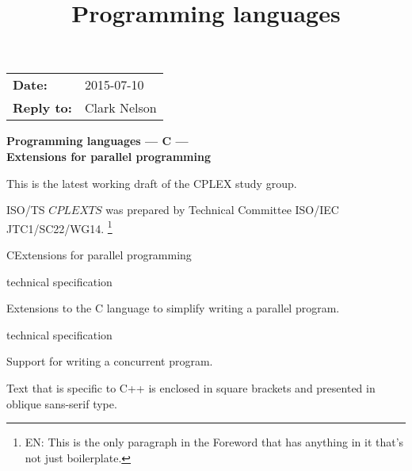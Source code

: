 \documentclass[
	techspec,	%
	final,		%
	notcopyright,	%
	letterpaper	%
	]{isov2}
\newcommand{\cplexts}{$CPLEXTS$}
\begin{document}
\begin{cover}
\begin{tabular}{l l}
\textbf{Date:} & 2015-07-10 \\
\textbf{Reply to:} & Clark Nelson
\end{tabular}

{\Huge
\bfseries
Programming languages --- C --- \\
Extensions for parallel programming
}

This is the latest working draft of the CPLEX study group.
\clearpage
\end{cover}


\begin{foreword}


ISO/TS
\cplexts{}
was prepared by Technical Committee ISO/IEC JTC1/SC22/WG14.%
\footnote{EN:
This is the only paragraph in the Foreword that has anything in it
that's not just boilerplate.
}

\fwdnopatents
\end{foreword}

\begin{introduction}
\intropatents
\end{introduction}

\title{Programming languages}{C}{Extensions for parallel programming}

\scopeclause
\begin{inscope}{technical specification}
\item
Extensions to the C language to simplify writing a parallel program.
\end{inscope}
\begin{outofscope}{technical specification}
\item
Support for writing a concurrent program.
\end{outofscope}

\normrefsclause
{}
\begin{nreferences}
\end{nreferences}




\pnum
\begin{cpp}
Text that is specific to C++
is enclosed in square brackets
and presented in oblique sans-serif type.
\end{cpp}
\end{document}
